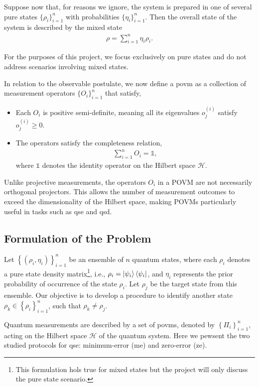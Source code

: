 \documentclass[12pt,letterpaper]{article}
\begin{document}
\begin{multicols}{2}
Suppose now that, for reasons we ignore, the system is prepared in one of several pure states $\{\rho_i\}_{i=1}^n$ with probabilities $\{\eta_i\}_{i=1}^n$. Then the overall state of the system is described by the mixed state
\begin{align*}
	\rho = \sum_{i=1}^n \eta_i \rho_i.
\end{align*}

For the purposes of this project, we focus exclusively on pure states and do not address scenarios involving mixed states.

In relation to the observable postulate, we now define a \gls{povm} as a collection of measurement operators $\{O_i\}_{i=1}^n$ that satisfy,
\begin{itemize}
	\item Each $O_i$ is positive semi-definite, meaning all its eigenvalues $o_j^{(i)}$ satisfy $o_j^{(i)} \geq 0$.
	\item The operators satisfy the completeness relation,
\begin{align*}
	\sum_{i=1}^n O_i = \mathds{1},
\end{align*}
where $\mathds{1}$ denotes the identity operator on the Hilbert space $\mathcal{H}$.
\end{itemize}

Unlike projective measurements, the operators $O_i$ in a POVM are not necessarily orthogonal projectors. This allows the number of measurement outcomes to exceed the dimensionality of the Hilbert space, making POVMs particularly useful in tasks such as \gls{qse} and \gls{qsd}.

\subsection{Formulation of the Problem}\label{sectionFormulationOfTheProblem}

Let $\left\{(\rho_i, \eta_i)\right\}_{i=1}^n$ be an ensemble of $n$ quantum states, where each $\rho_i$ denotes a pure state density matrix\footnote{This formulation hols true for mixed states but the project will only discuss the pure state scenario.}, i.e., $\rho_i = \ket{\psi_i}\bra{\psi_i}$, and $\eta_i$ represents the prior probability of occurrence of the state $\rho_i$. Let $\rho_j$ be the target state from this ensemble. Our objective is to develop a procedure to identify another state $\rho_k \in \left\{\rho_i\right\}_{i=1}^n$, such that $\rho_k \neq \rho_j$.

Quantum measurements are described by a set of \glspl{povm}, denoted by $\left\{\Pi_i\right\}_{i=1}^n$, acting on the Hilbert space $\mathcal{H}$ of the quantum system. Here we pewsent the two studied protocols for \gls{qse}: minimum-error (\gls{me}) and zero-error (\gls{ze}).


\end{multicols}
\end{document}
